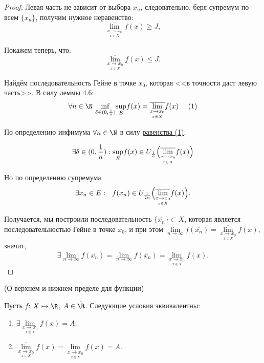 \begin{proof}
    Левая часть не зависит от выбора $x_{n}$, следовательно, беря супремум по всем $\{x_{n}\}$, получим нужное неравенство:
    $$
    \overline{\lim\limits_{\underset{x \in X}{x\to x_0}}} f(x) \geq J,
    $$

    Покажем теперь, что:
    $$  \overline{\lim\limits_{\underset{x \in X}{x\to x_0}}} f(x) \leq J.
    $$

    Найдём последовательность Гейне в точке $x_{0}$, которая <<в точности даст левую часть>>. В силу \hyperlink{lemm4.6}{леммы 4.6}: \hypertarget{prop4.9}
    {}
    $$
    \forall n \in \N  \ \underset{\delta \in (0, \frac{1}{n})}{\inf} \underset{E}{\sup} f(x) = \overline{\lim\limits_{\underset{x \in X}{x\to x_0}}} f(x) \  \quad (1)
    $$



    По определению инфимума  $\forall n \in \N$ в силу \hyperlink{prop4.9}{равенства (1)}: 
    
    $$\exists \delta \in ( 0, \frac{1}{n}): \underset{E}{\sup} f(x) \in U_{\frac{1}{n}} \Bigl( \overline{\lim\limits_{\underset{x \in X}{x\to x_0}}} f(x) \Bigr)$$

    Но по определению супремума
    $$ \exists x_{n}\in E: \ \ f(x_{n}) \in  U_{\frac{1}{2n}} \Bigl( \overline{\lim\limits_{\underset{x \in X}{x\to x_0}}} f(x) \Bigr).$$

    Получается, мы построили последовательность $\{\overline{x_{n}}\} \subset X$, которая является последовательностью Гейне в точке $x_{0}$, и при этом $\lim\limits_{n \to \infty} f(\overline{x_{n}}) = \overline{\lim\limits_{\underset{x \in X}{x\to x_0}}} f(x)$, значит,
     $$\exists \overline{\lim\limits_{n \to \infty}} f(\overline{x_{n}}) = \lim\limits_{n \to \infty} f(\overline{x_{n}}) = \overline{\lim\limits_{\underset{x \in X}{x\to x_0}}} f(x).
    $$
\end{proof}

\begin{theorem}
    \hypertarget{thrm4.10}{(О верхнем и нижнем пределе для функции) }Пусть $f$: $X \mapsto \R$, $A \in \Hat{\R}$. Следующие условия эквивалентны:

\begin{enumerate}
    \item $ \exists \lim\limits_{\underset{x \in X}{x\to x_0}} f(x) = A;$
    \item $\overline{\lim\limits_{\underset{x \in X}{x\to x_0}}} f(x) = \lim\limits_{\underset{x \in X}{\overline{x\to x_0}}} f(x) = A.$
\end{enumerate}    
\end{theorem}

